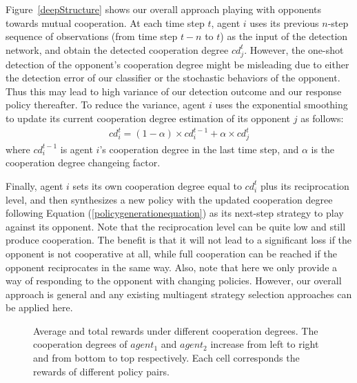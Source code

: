 \documentclass{article}
\begin{document}
Figure~\ref{deepStructure} shows our overall approach playing with opponents towards mutual cooperation. At each time step $t$, agent $i$ uses its previous $n$-step sequence of observations (from time step $t-n$ to $t$) as the input of the detection network, and obtain the detected cooperation degree $cd_j^t$. However, the one-shot detection of the opponent's cooperation degree might be misleading due to either the detection error of our classifier or the stochastic behaviors of the opponent. Thus this may lead to high variance of our detection outcome and our response policy thereafter. To reduce the variance, agent $i$ uses the exponential smoothing to update its current cooperation degree estimation of its opponent $j$ as follows:
\begin{eqnarray}
cd_i^t = (1 - \alpha) \times cd_i^{t-1} + \alpha \times cd_j^t
\end{eqnarray}
where $cd_i^{t-1}$ is agent $i$'s cooperation degree in the last time step, and $\alpha$ is the cooperation degree changeing factor.

Finally, agent $i$ sets its own cooperation degree equal to $cd_i^t$ plus its reciprocation level, and then synthesizes a new policy with the updated cooperation degree following Equation (\ref{policygenerationequation}) as its next-step strategy to play against its opponent. Note that the reciprocation level can be quite low and still produce cooperation. The benefit is that it will not lead to a significant loss if the opponent is not cooperative at all, while full cooperation can be reached if the opponent reciprocates in the same way. Also, note that here we only provide a way of responding to the opponent with changing policies. However, our overall approach is general and any existing multiagent strategy selection approaches can be applied here.

\begin{figure*}[htbp]
\centering
{}


\caption{ Average and total rewards under different cooperation degrees. The cooperation degrees of $agent_1$ and $agent_2$ increase from left to right and from bottom to top respectively. Each cell corresponds the rewards of different policy pairs. }
\label{rewardheatmap}
\end{figure*}
\end{document}
